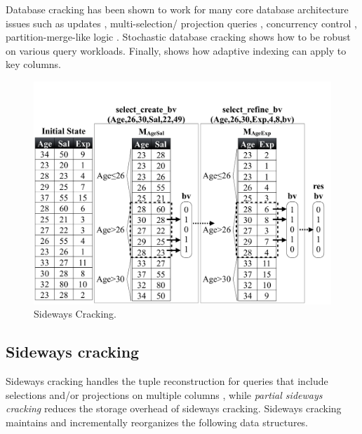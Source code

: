 Database cracking has been shown to work for many core database architecture issues 
such as updates \cite{DBLP:conf/sigmod/IdreosKM07}, multi-selection/ projection queries \cite{DBLP:conf/sigmod/IdreosKM09}, concurrency control \cite{DBLP:journals/pvldb/GraefeHIKM12, CrackingTransactions}, partition-merge-like logic \cite{DBLP:conf/edbt/GraefeK10,DBLP:journals/pvldb/IdreosMKG11}. 
Stochastic database cracking \cite{DBLP:journals/pvldb/HalimIKY12} shows how to be robust on various query workloads.
Finally, \cite{IndexingKeys} shows how adaptive indexing can apply to key columns.


\begin{figure}[t]
\begin{center}
\vspace*{3\baselineskip}
\includegraphics[trim=0cm 1cm 0cm 9cm, width=\columnwidth]{Figures/sideways_cracking}
\caption{Sideways Cracking.}
\label{fig:sideways}
\end{center}
\end{figure}

\subsection{Sideways cracking}
Sideways cracking handles the tuple reconstruction for queries that
include selections and/or projections on multiple columns 
\cite{DBLP:conf/sigmod/IdreosKM09}, while \emph{partial sideways cracking} \cite{DBLP:conf/sigmod/IdreosKM09} 
reduces the storage overhead of sideways cracking.
Sideways cracking maintains and incrementally reorganizes the following data structures.

